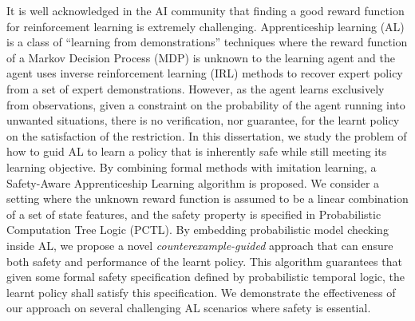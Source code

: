 It is well acknowledged in the AI community that finding a good reward function for reinforcement learning is extremely challenging. Apprenticeship learning (AL) is a class of ``learning from demonstrations'' techniques where the reward function of a Markov Decision Process (MDP) is unknown to the learning agent and the agent uses inverse reinforcement learning (IRL) methods to recover expert policy from a set of expert demonstrations. However, as the agent learns exclusively from observations, given a constraint on the probability of the agent running into unwanted situations, there is no verification, nor guarantee, for the learnt policy on the satisfaction of the restriction. In this dissertation, we study the problem of how to guid AL to learn a policy that is inherently safe while still meeting its learning objective. By combining formal methods with imitation learning, a Safety-Aware Apprenticeship Learning algorithm is proposed. We consider a setting where the unknown reward function is assumed to be a linear combination of a set of state features, and the safety property is specified in Probabilistic Computation Tree Logic (PCTL). By embedding probabilistic model checking inside AL, we propose a novel {\it counterexample-guided} approach that can ensure both safety and performance of the learnt policy. This algorithm guarantees that given some formal safety specification defined by probabilistic temporal logic, the learnt policy shall satisfy this specification. We demonstrate the effectiveness of our approach on several challenging AL scenarios where safety is essential.